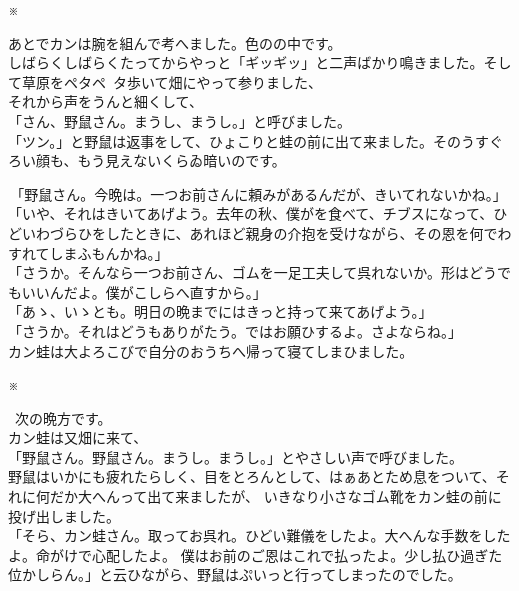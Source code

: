 \documentclass[
a4paper,
10pt,
book]
{tarticle}
\begin{document}
\indent \indent \indent \indent \indent \indent \indent \indent \indent \indent ※

\begin{linenumbers}
    \indent あとでカンは腕を組んで考へました。色のの中です。\\
    しばらくしばらくたってからやっと「ギッギッ」と二声ばかり鳴きました。そして草原をペタペ~タ歩いて畑にやって参りました、\\
    \indent それから声をうんと細くして、\\
    「さん、野鼠さん。まうし、まうし。」と呼びました。\\
    「ツン。」と野鼠は返事をして、ひょこりと蛙の前に出て来ました。そのうすぐろい顔も、もう見えないくらゐ暗いのです。
\end{linenumbers}

\newpage
\setcounter{page}{6}
\thispagestyle{fancy}
\fancyhead[R]{\empty}
\begin{linenumbers}
    \noindent \,「野鼠さん。今晩は。一つお前さんに頼みがあるんだが、きいてれないかね。」\\
    「いや、それはきいてあげよう。去年の秋、僕がを食べて、チブスになって、ひどいわづらひをしたときに、あれほど親身の介抱を受けながら、その恩を何でわすれてしまふもんかね。」\\
    「さうか。そんなら一つお前さん、ゴムを一足工夫して呉れないか。形はどうでもいいんだよ。僕がこしらへ直すから。」\\
    「あゝ、いゝとも。明日の晩までにはきっと持って来てあげよう。」\\
    「さうか。それはどうもありがたう。ではお願ひするよ。さよならね。」\\
    \indent カン蛙は大よろこびで自分のおうちへ帰って寝てしまひました。
\end{linenumbers}

\indent \indent \indent \indent \indent \indent \indent \indent \indent \indent ※

\begin{linenumbers}
    \noindent \, 次の晩方です。\\
    \indent カン蛙は又畑に来て、\\
    「野鼠さん。野鼠さん。まうし。まうし。」とやさしい声で呼びました。\\
    \indent 野鼠はいかにも疲れたらしく、目をとろんとして、はぁあとため息をついて、それに何だか大へんって出て来ましたが、
    いきなり小さなゴム靴をカン蛙の前に投げ出しました。\\
    「そら、カン蛙さん。取ってお呉れ。ひどい難儀をしたよ。大へんな手数をしたよ。命がけで心配したよ。
    僕はお前のご恩はこれで払ったよ。少し払ひ過ぎた位かしらん。」と云ひながら、野鼠はぷいっと行ってしまったのでした。
\end{linenumbers}
\end{document}
